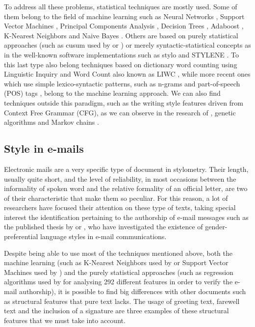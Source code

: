 To address all these problems, statistical techniques are mostly used. Some of them belong to the field of machine learning such as Neural Networks \citep{ng1997feature}, Support Vector Machines \citep{abbasi2005applying}, Principal Components Analysis \citep{PCAstyle}, Decision Trees \citep{apte1998text}, Adaboost \citep{cheng2011author}, K-Nearest Neighbors \citep{kucukyilmaz2008chat} and Naive Bayes \citep{sahami1998bayesian}. Others are based on purely statistical approaches (such as cusum used by \cite{summers1999analysing} or \cite{thisted1987did}) or merely syntactic-statistical concepts as in the well-known software implementations such as stylo \citep{stylor} and STYLENE \citep{stylene}. To this last type also belong techniques based on dictionary word counting using Linguistic Inquiry and Word Count also known as LIWC \citep{liwc2015}, while more recent ones which use simple lexico-syntactic patterns, such as n-grams and part-of-speech (POS) tags \citep{mihalcea2009lie, ott2011finding}, belong to the machine learning approach. We can also find techniques outside this paradigm, such as the writing style features driven from Context Free Grammar (CFG), as we can observe in the research of \cite{cfgstylo}, genetic algorithms \citep{holmes1995federalist} and Markov chains \citep{tweedie1998variable}.

\subsection{Style in e-mails}\label{ssect:styloemail}
Electronic mails are a very specific type of document in stylometry. Their length, usually quite short, and the level of reliability, in most occasions between the informality of spoken word and the relative formality of an official letter, are two of their characteristic that make them so peculiar. For this reason, a lot of researchers have focused their attention on these type of texts, taking special interest the identification pertaining to the authorship of e-mail messages such as the published thesis by \cite{corney2003analysing} or \cite{thomson2001predicting}, who have investigated the existence of gender-preferential language styles in e-mail communications.

Despite being able to use most of the techniques mentioned above, both the machine learning (such as K-Nearest Neighbors used by \cite{calix2008stylometry} or Support Vector Machines used by \cite{de2001mining}) and the purely statistical approaches (such as regression algorithms used by \cite{iqbal2010mining} for analysing 292 different features in order to verify the e-mail authorship), it is possible to find big differences with other documents such as structural features that pure text lacks. The usage of greeting text, farewell text and the inclusion of a signature are three examples of these structural features that we must take into account.

